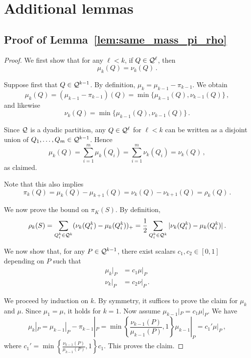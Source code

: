 \section{Additional lemmas}\label{sec:proofs}
\subsection{Proof of Lemma~\ref{lem:same_mass_pi_rho}}
\begin{proof}
We first show that for any $\ell < k$, if $Q \in \mathcal{Q}^{\ell}$, then
\begin{equation*}
\mu_k(Q) = \nu_k(Q)\,.
\end{equation*}

Suppose first that $Q \in \mathcal{Q}^{k-1}$.
By definition, $\mu_k = \mu_{k-1} - \pi_{k-1}$.
We obtain
\begin{equation*}
\mu_k(Q) = (\mu_{k-1} - \pi_{k-1})(Q) = \min\{\mu_{k-1}(Q), \nu_{k-1}(Q)\}\,,
\end{equation*}
and likewise
\begin{equation*}
\nu_k(Q) = \min\{\mu_{k-1}(Q), \nu_{k-1}(Q)\}\,.
\end{equation*}

Since $\mathcal{Q}$ is a dyadic partition, any $Q \in \mathcal{Q}^\ell$ for $\ell < k$ can be written as a disjoint union of $Q_1, \dots, Q_m \in \mathcal{Q}^{k-1}$.
Hence
\begin{equation*}
\mu_k(Q) = \sum_{i=1}^m \mu_k(Q_i) = \sum_{i=1}^m \nu_k(Q_i) = \nu_k(Q)\,,
\end{equation*}
as claimed.

Note that this also implies
\begin{equation*}
\pi_k(Q) = \mu_k(Q) - \mu_{k+1}(Q) = \nu_k(Q) - \nu_{k+1}(Q) = \rho_k(Q)\,.
\end{equation*}

We now prove the bound on $\pi_K(S)$.
By definition, 
\begin{equation*}
\rho_k(S) = \sum_{Q_i^k \in \mathcal{Q}^k} (\nu_k(Q_i^k) - \mu_k(Q_i^k))_+ = \frac 1 2 \sum_{Q_i^k \in \mathcal{Q}^k} |\nu_k(Q_i^k) - \mu_k(Q_i^k)|\,.
\end{equation*}

We now show that, for any $P \in \mathcal{Q}^{k-1}$, there exist scalars $c_1, c_2 \in [0, 1]$ depending on $P$ such that
\begin{align*}
\mu_k|_P & = c_1 \mu|_P \\
\nu_k|_P & = c_2 \nu|_P\,.
\end{align*}

We proceed by induction on $k$.
By symmetry, it suffices to prove the claim for $\mu_k$ and $\mu$.
Since $\mu_1 = \mu$, it holds for $k = 1$.
Now assume $\mu_{k-1}|_P = c_1 \mu|_P$.
We have
\begin{equation*}
\mu_k|_P = \mu_{k-1}|_P - \pi_{k-1}|_P = \min\left\{\frac{\nu_{k-1}(P)}{\mu_{k-1}(P)}, 1\right\} \mu_{k-1}|_P = c_1' \mu|_P\,,
\end{equation*}
where $c_1' = \min\left\{\frac{\nu_{k-1}(P)}{\mu_{k-1}(P)}, 1\right\} c_1$.
This proves the claim.



\end{proof}
